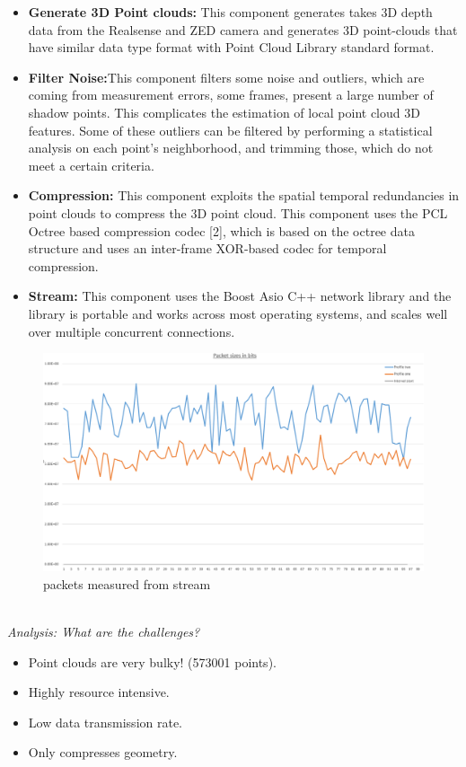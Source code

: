 \begin{itemize}
    \item \textbf{Generate 3D Point clouds:} This component generates takes 3D depth data from the Realsense and ZED camera and generates 3D point-clouds that have similar data type format with Point Cloud Library standard format.
    \item \textbf{Filter Noise:}This component filters some noise and outliers, which are coming from measurement errors, some frames, present a large number of shadow points. This complicates the estimation of local point cloud 3D features. Some of these outliers can be filtered by performing a statistical analysis on each point's neighborhood, and trimming those, which do not meet a certain criteria.
    \item \textbf{Compression:} This component exploits the spatial temporal redundancies in point clouds to compress the 3D point cloud. This component uses the PCL Octree based compression codec [2], which is based on the octree data structure and uses an inter-frame XOR-based codec for temporal compression.
    \item \textbf{Stream:} This component uses the Boost Asio C++ network library and the library is portable and works across most operating systems, and scales well over multiple concurrent connections.
\end{itemize}

\begin{figure}[h]
    \centering
    \includegraphics[scale=0.3]{images/wireshark_general.jpg}
    \caption{packets measured from stream}
    \label{fig:StreamingPipe}
\end{figure}\\

\textit{Analysis: What are the challenges?}
\begin{itemize}
    \item Point clouds are very bulky! (573001 points).
    \item Highly resource intensive.
    \item Low  data transmission rate.
    \item Only compresses geometry.
\end{itemize}


